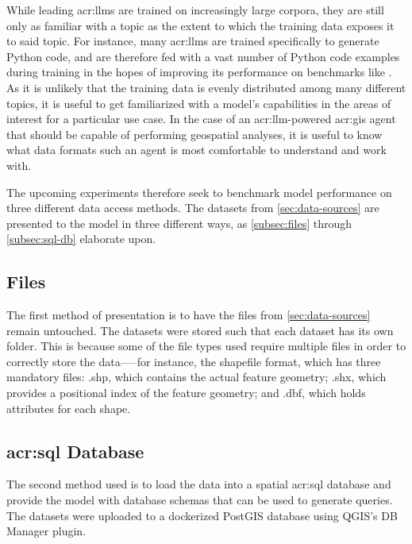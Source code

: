 While leading \glspl{acr:llm} are trained on increasingly large corpora, they are still only as familiar with a topic as the extent to which the training data exposes it to said topic. For instance, many \glspl{acr:llm} are trained specifically to generate Python code, and are therefore fed with a vast number of Python code examples during training in the hopes of improving its performance on benchmarks like . As it is unlikely that the training data is evenly distributed among many different topics, it is useful to get familiarized with a model's capabilities in the areas of interest for a particular use case. In the case of an \acrshort{acr:llm}-powered \acrshort{acr:gis} agent that should be capable of performing geospatial analyses, it is useful to know what data formats such an agent is most comfortable to understand and work with.

The upcoming experiments therefore seek to benchmark model performance on three different data access methods. The datasets from \autoref{sec:data-sources} are presented to the model in three different ways, as \autoref{subsec:files} through \autoref{subsec:sql-db} elaborate upon.

\subsection{Files}
\label{subsec:files}

The first method of presentation is to have the files from \autoref{sec:data-sources} remain untouched. The datasets were stored such that each dataset has its own folder. This is because some of the file types used require multiple files in order to correctly store the data—--for instance, the shapefile format, which has three mandatory files: .shp, which contains the actual feature geometry; .shx, which provides a positional index of the feature geometry; and .dbf, which holds attributes for each shape.

\subsection[SQL Database]{\acrshort{acr:sql} Database}
\label{subsec:sql-db}

The second method used is to load the data into a spatial \acrshort{acr:sql} database and provide the model with database schemas that can be used to generate queries. The datasets were uploaded to a dockerized PostGIS database using QGIS's DB Manager plugin.

